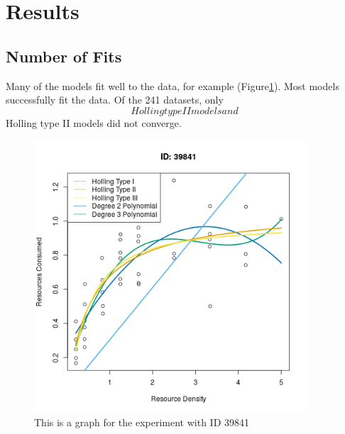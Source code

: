 \documentclass{article}
\begin{document}
\section{Results}
\subsection{Number of Fits}
Many of the models fit well to the data, for example (Figure\ref{fig:2}). Most models successfully fit the data. Of the 241 datasets, only $$ Holling type II models and $$ Holling type II models did not converge. 
\begin{figure}[h!t] 
    \centering
    \includegraphics[width=4in]{../Results/Plots/39841.png}
    \caption{This is a graph for the experiment with ID 39841}
    \label{fig:2}
\end{figure}
\end{document}
